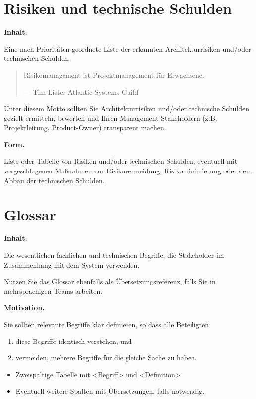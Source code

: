 \documentclass[]{article}
\begin{document}
\hypertarget{section-technical-risks}{%
\section{Risiken und technische
Schulden}\label{section-technical-risks}}

\textbf{Inhalt.}

Eine nach Prioritäten geordnete Liste der erkannten Architekturrisiken
und/oder technischen Schulden.

\begin{quote}
Risikomanagement ist Projektmanagement für Erwachsene.

---  Tim Lister Atlantic Systems Guild
\end{quote}

Unter diesem Motto sollten Sie Architekturrisiken und/oder technische
Schulden gezielt ermitteln, bewerten und Ihren Management-Stakeholdern
(z.B. Projektleitung, Product-Owner) transparent machen.

\textbf{Form.}

Liste oder Tabelle von Risiken und/oder technischen Schulden, eventuell
mit vorgeschlagenen Maßnahmen zur Risikovermeidung, Risikominimierung
oder dem Abbau der technischen Schulden.

\hypertarget{section-glossary}{%
\section{Glossar}\label{section-glossary}}

\textbf{Inhalt.}

Die wesentlichen fachlichen und technischen Begriffe, die Stakeholder im
Zusammenhang mit dem System verwenden.

Nutzen Sie das Glossar ebenfalls als Übersetzungsreferenz, falls Sie in
mehrsprachigen Teams arbeiten.

\textbf{Motivation.}

Sie sollten relevante Begriffe klar definieren, so dass alle Beteiligten

\begin{enumerate}
\def\labelenumi{\arabic{enumi}.}
\item
  diese Begriffe identisch verstehen, und
\item
  vermeiden, mehrere Begriffe für die gleiche Sache zu haben.
\end{enumerate}

\begin{itemize}
\item
  Zweispaltige Tabelle mit \textless{}Begriff\textgreater{} und
  \textless{}Definition\textgreater{}
\item
  Eventuell weitere Spalten mit Übersetzungen, falls notwendig.
\end{itemize}
\end{document}
